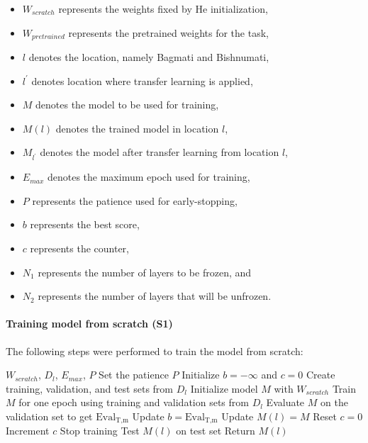 \documentclass{ieeeaccess}
\begin{document}
\begin{itemize}
    \item $W_{scratch}$ represents the weights fixed by He initialization, 
    \item $W_{pretrained}$ represents the pretrained weights for the task,
    \item $\textit{l}$ denotes the location, namely Bagmati and Bishnumati,
    \item $\textit{l}^{\prime}$ denotes location where transfer learning is applied,
    \item $M$ denotes the model to be used for training,
    \item $M(l)$ denotes the trained model in location $l$,
    \item $M_{l^{\prime}}$ denotes the model after transfer learning from location $l$,
    \item $\textit{E}_{\textit{max}}$  denotes the maximum epoch used for training,
    \item $\textit{P}$ represents the patience used for early-stopping,
    \item $\textit{b}$ represents the best score, 
    \item $\textit{c}$ represents the counter,
    \item $N_1$ represents the number of layers to be frozen, and 
    \item $N_2$ represents the number of layers that will be unfrozen.
\end{itemize}

\paragraph{Training model from scratch (S1)}
The following steps were performed to train the model from scratch:

\begin{algorithm}[!ht]
\caption{Training model from scratch}
\label{alg:train-from-scratch}
\begin{algorithmic}[1]
\REQUIRE $W_{scratch}$, $D_{\textit{l}}$, $E_{max}$, $P$
\STATE Set the patience $P$ 
\STATE Initialize $\textit{b} = -\infty$ and $\textit{c} = 0$
\STATE Create training, validation, and test sets from $D_{\textit{l}}$
\STATE Initialize model $M$ with  $W_{scratch}$
    \STATE Train $M$ for one epoch using training and validation sets from $D_{\textit{l}}$
    \STATE Evaluate $M$ on the validation set to get $\text{Eval}_{\text{T},\text{m}}$  
        \STATE Update $b = \text{Eval}_{\text{T},\text{m}}$
        \STATE Update $M(l)=M$
        \STATE Reset $c = 0$
    \ELSE
        \STATE Increment $c$
    \ENDIF
        \STATE Stop training
        \STATE Test $M(l)$ on test set
        \STATE Return $M(l)$
    \ENDIF
\ENDFOR
\end{algorithmic}
\end{algorithm}
\end{document}
